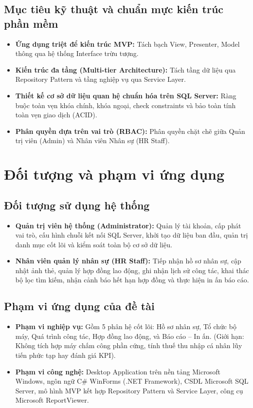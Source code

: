 \documentclass[12pt,a4paper]{report}
\begin{document}
\subsection{Mục tiêu kỹ thuật và chuẩn mực kiến trúc phần mềm}
\begin{itemize}[leftmargin=1.0cm]
    \item \textbf{Ứng dụng triệt để kiến trúc MVP:} Tách bạch View, Presenter, Model thông qua hệ thống Interface trừu tượng.
    \item \textbf{Kiến trúc đa tầng (Multi-tier Architecture):} Tách tầng dữ liệu qua Repository Pattern và tầng nghiệp vụ qua Service Layer.
    \item \textbf{Thiết kế cơ sở dữ liệu quan hệ chuẩn hóa trên SQL Server:} Ràng buộc toàn vẹn khóa chính, khóa ngoại, check constraints và bảo toàn tính toàn vẹn giao dịch (ACID).
    \item \textbf{Phân quyền dựa trên vai trò (RBAC):} Phân quyền chặt chẽ giữa Quản trị viên (Admin) và Nhân viên Nhân sự (HR Staff).
\end{itemize}

\section{Đối tượng và phạm vi ứng dụng}

\subsection{Đối tượng sử dụng hệ thống}
\begin{itemize}[leftmargin=1.0cm]
    \item \textbf{Quản trị viên hệ thống (Administrator):} Quản lý tài khoản, cấp phát vai trò, cấu hình chuỗi kết nối SQL Server, khởi tạo dữ liệu ban đầu, quản trị danh mục cốt lõi và kiểm soát toàn bộ cơ sở dữ liệu.
    \item \textbf{Nhân viên quản lý nhân sự (HR Staff):} Tiếp nhận hồ sơ nhân sự, cập nhật ảnh thẻ, quản lý hợp đồng lao động, ghi nhận lịch sử công tác, khai thác bộ lọc tìm kiếm, nhận cảnh báo hết hạn hợp đồng và thực hiện in ấn báo cáo.
\end{itemize}

\subsection{Phạm vi ứng dụng của đề tài}
\begin{itemize}[leftmargin=1.0cm]
    \item \textbf{Phạm vi nghiệp vụ:} Gồm 5 phân hệ cốt lõi: Hồ sơ nhân sự, Tổ chức bộ máy, Quá trình công tác, Hợp đồng lao động, và Báo cáo -- In ấn. (Giới hạn: Không tích hợp máy chấm công phần cứng, tính thuế thu nhập cá nhân lũy tiến phức tạp hay đánh giá KPI).
    \item \textbf{Phạm vi công nghệ:} Desktop Application trên nền tảng Microsoft Windows, ngôn ngữ C\# WinForms (.NET Framework), CSDL Microsoft SQL Server, mô hình MVP kết hợp Repository Pattern và Service Layer, công cụ Microsoft ReportViewer.
\end{itemize}
\end{document}
